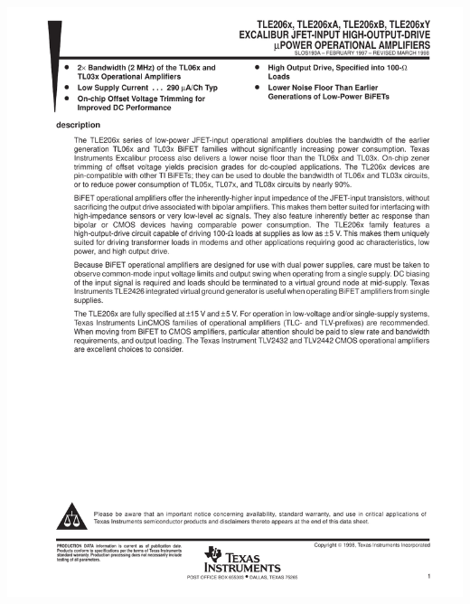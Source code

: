 \begin{center}
\newpage
\includegraphics[scale=0.9, page=6]{tle2061.pdf}
\end{center}
\newpage


\endinput
